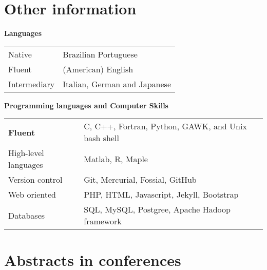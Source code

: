 \documentclass[letter,10pt]{article} %
\begin{document}
\section{Other information}

{\bf Languages}

\begin{longtable}{p{3.5cm}p{10cm}}
  Native & Brazilian Portuguese \\
  Fluent & (American) English \\
  Intermediary & Italian, German and Japanese \\
\end{longtable}

{\bf Programming languages and Computer Skills}

\begin{longtable}{p{3.5cm}p{10cm}}
  {\bf Fluent} & C, C++, Fortran, Python, GAWK, and Unix bash shell \\
  High-level languages & Matlab, R, Maple \\
  Version control & Git, Mercurial, Fossial, GitHub \\
  Web oriented & PHP, HTML, Javascript, Jekyll, Bootstrap \\
  Databases & SQL, MySQL, Postgree, Apache Hadoop framework
\end{longtable}



\section{Abstracts in conferences}
\printbibliography[type=proceedings]
\end{document}
